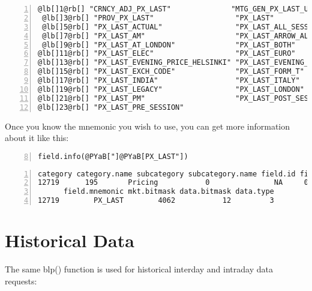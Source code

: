 \documentclass[a4paper]{article}
\begin{document}
\begin{Verbatim}[commandchars=@\[\],numbers=left,firstnumber=1,stepnumber=1]
 @lb[]1@rb[] "CRNCY_ADJ_PX_LAST"              "MTG_GEN_PX_LAST_UPDATE"        
 @lb[]3@rb[] "PROV_PX_LAST"                   "PX_LAST"                       
 @lb[]5@rb[] "PX_LAST_ACTUAL"                 "PX_LAST_ALL_SESSIONS"          
 @lb[]7@rb[] "PX_LAST_AM"                     "PX_LAST_ARROW_ALL_SESSION"     
 @lb[]9@rb[] "PX_LAST_AT_LONDON"              "PX_LAST_BOTH"                  
@lb[]11@rb[] "PX_LAST_ELEC"                   "PX_LAST_EURO"                  
@lb[]13@rb[] "PX_LAST_EVENING_PRICE_HELSINKI" "PX_LAST_EVENING_TRADE_HELSINKI"
@lb[]15@rb[] "PX_LAST_EXCH_CODE"              "PX_LAST_FORM_T"                
@lb[]17@rb[] "PX_LAST_INDIA"                  "PX_LAST_ITALY"                 
@lb[]19@rb[] "PX_LAST_LEGACY"                 "PX_LAST_LONDON"                
@lb[]21@rb[] "PX_LAST_PM"                     "PX_LAST_POST_SESSION"          
@lb[]23@rb[] "PX_LAST_PRE_SESSION"           
\end{Verbatim}

    

Once you know the mnemonic you wish to use, you can get more information about it like this:

\begin{Verbatim}[commandchars=@\[\],numbers=left,firstnumber=8,stepnumber=1]
field.info(@PYaB["]@PYaB[PX_LAST"])
\end{Verbatim}

    

\begin{Verbatim}[commandchars=@\[\],numbers=left,firstnumber=1,stepnumber=1]
      category category.name subcategory subcategory.name field.id field.name
12719      195       Pricing           0               NA     0560 Last Price
      field.mnemonic mkt.bitmask data.bitmask data.type
12719        PX_LAST        4062           12         3
\end{Verbatim}

    



\section{Historical Data} %
\label{sec:historical_data}

The same blp() function is used for historical interday and intraday data requests:
\end{document}
